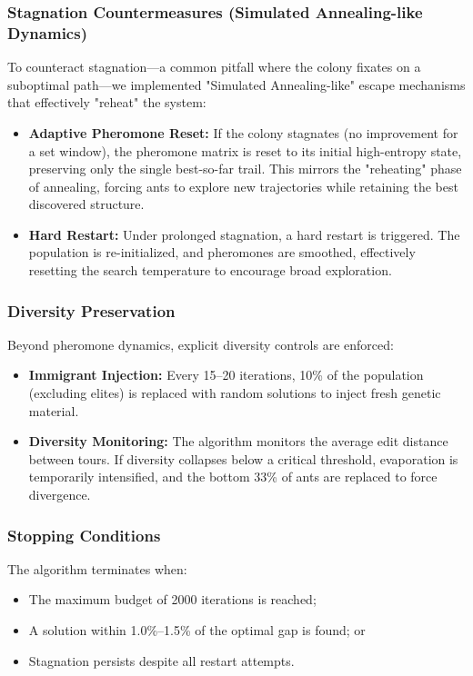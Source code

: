 \documentclass[11pt,a4paper]{article}
\begin{document}
\subsubsection*{Stagnation Countermeasures (Simulated Annealing-like Dynamics)}
To counteract stagnation—a common pitfall where the colony fixates on a suboptimal path—we implemented "Simulated Annealing-like" escape mechanisms that effectively "reheat" the system:
\begin{itemize}[nosep]
  \item \textbf{Adaptive Pheromone Reset:} If the colony stagnates (no improvement for a set window), the pheromone matrix is reset to its initial high-entropy state, preserving only the single best-so-far trail. This mirrors the "reheating" phase of annealing, forcing ants to explore new trajectories while retaining the best discovered structure.
  \item \textbf{Hard Restart:} Under prolonged stagnation, a hard restart is triggered. The population is re-initialized, and pheromones are smoothed, effectively resetting the search temperature to encourage broad exploration.
\end{itemize}

\subsubsection*{Diversity Preservation}
Beyond pheromone dynamics, explicit diversity controls are enforced:
\begin{itemize}[nosep]
  \item \textbf{Immigrant Injection:} Every 15--20 iterations, 10\% of the population (excluding elites) is replaced with random solutions to inject fresh genetic material.
  \item \textbf{Diversity Monitoring:} The algorithm monitors the average edit distance between tours. If diversity collapses below a critical threshold, evaporation is temporarily intensified, and the bottom 33\% of ants are replaced to force divergence.
\end{itemize}

\subsubsection*{Stopping Conditions}
The algorithm terminates when:
\begin{itemize}[nosep]
  \item The maximum budget of 2000 iterations is reached;
  \item A solution within 1.0\%--1.5\% of the optimal gap is found; or
  \item Stagnation persists despite all restart attempts.
\end{itemize}
\end{document}

